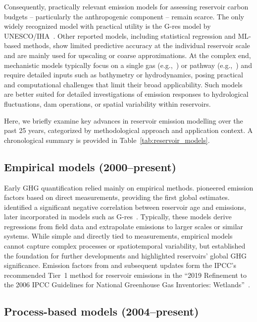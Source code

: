 \documentclass[final,1p,times]{elsarticle}
\begin{document}
Consequently, practically relevant emission models for assessing reservoir carbon budgets -- particularly the anthropogenic component -- remain scarce. 
The only widely recognized model with practical utility is the G-res model by UNESCO/IHA~\cite{Prairie2017b, Prairie2021}. 
Other reported models, including statistical regression and \ac{ML}-based methods, show limited predictive accuracy at the individual reservoir scale~\cite{Hansen2022} and are mainly used for upscaling or coarse approximations. 
At the complex end, mechanistic models typically focus on a single gas (e.g.,~\cite{Wu2022, Lomov2024}) or pathway (e.g.,~\cite{Berger2014}) and require detailed inputs such as bathymetry or hydrodynamics, posing practical and computational challenges that limit their broad applicability. 
Such models are better suited for detailed investigations of emission responses to hydrological fluctuations, dam operations, or spatial variability within reservoirs.

Here, we briefly examine key advances in reservoir emission modelling over the past 25 years, categorized by methodological approach and application context. 
A chronological summary is provided in Table~\ref{tab:reservoir_models}.

\subsection{Empirical models (2000--present)}
\label{subsec:empirical_models}

Early \ac{GHG} quantification relied mainly on empirical methods. 
\citet{Louis2000} pioneered emission factors based on direct measurements, providing the first global estimates. 
\citet{Barros2011} identified a significant negative correlation between reservoir age and emissions, later incorporated in models such as G-res~\cite{Prairie2017b, Prairie2021}. 
Typically, these models derive regressions from field data and extrapolate emissions to larger scales or similar systems. 
While simple and directly tied to measurements, empirical models cannot capture complex processes or spatiotemporal variability, but established the foundation for further developments and highlighted reservoirs’ global \ac{GHG} significance. 
Emission factors from \citet{Louis2000} and subsequent updates form the IPCC's recommended Tier~1 method for reservoir emissions in the ``2019 Refinement to the 2006 \acs{IPCC} Guidelines for National Greenhouse Gas Inventories: Wetlands''~\cite{IPCC2019}.

\subsection{Process-based models (2004--present)}
\label{sec:process_models}
\end{document}

